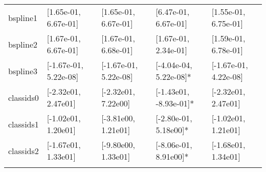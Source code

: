 \begin{table*}[tb]
\begin{tabular}{@{}p{1.4cm}L{2.55cm}L{2.7cm}L{2.6cm}L{2.5cm}@{}}
		bspline1 & [1.65e-01, 6.67e-01] & [1.65e-01, 6.67e-01] & [6.47e-01, 6.67e-01] & [1.55e-01, 6.75e-01]\\
		\mydashline{}
		bspline2 & [1.67e-01, 6.67e-01] & [1.67e-01, 6.68e-01] & [1.67e-01, 2.34e-01] & [1.59e-01, 6.78e-01] \\
		\mydashline{}
		bspline3 & [-1.67e-01, 5.22e-08] & [-1.67e-01, 5.22e-08] & [-4.04e-04, 5.22e-08]* & [-1.67e-01, 4.22e-08]\\
		\mydashline{}
		classids0 & [-2.32e01, 2.47e01] & [-2.32e01, 7.22e00] & [-1.43e01, -8.93e-01]* & [-2.32e01, 2.47e01]\\
		\mydashline{}
		classids1 & [-1.02e01, 1.20e01] & [-3.81e00, 1.21e01] & [-2.80e-01, 5.18e00]* & [-1.02e01, 1.21e01]\\
		\mydashline{}
		classids2 & [-1.67e01, 1.33e01] & [-9.80e00, 1.33e01] & [-8.06e-01, 8.91e00]* & [-1.68e01, 1.34e01]\\
		\mydashline{}

\end{tabular}
\end{table*}
